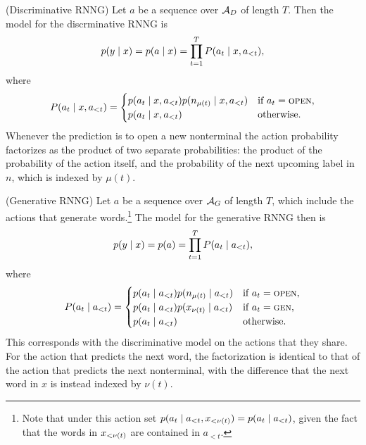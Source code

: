 \begin{definition}{(Discriminative RNNG)}
  Let $a$ be a sequence over $\mathcal{A}_D$ of length $T$. Then the model for the discrminative RNNG is
  \begin{align}
    \label{eq:disc-model}
    p(y \mid x) = p(a \mid x) = \prod_{t=1}^T P( a_t \mid x, a_{<t}),
  \end{align}
  where
  \begin{equation}
    \label{eq:disc-model}
    P( a_t \mid x, a_{<t}) =
    \begin{cases}
      p( a_t \mid x, a_{<t} ) p( n_{ \mu(t) } \mid x, a_{<t} ) & \text{if } a_t = \textsc{open},  \\
      p( a_t \mid x, a_{<t} ) & \text{otherwise.}  \\
    \end{cases}
  \end{equation}
Whenever the prediction is to open a new nonterminal the action probability factorizes as the product of two separate probabilities: the product of the probability of the action itself, and the probability of the next upcoming label in $n$, which is indexed by $\mu(t)$.
\end{definition}

\begin{definition}{(Generative RNNG)}
  Let $a$ be a sequence over $\mathcal{A}_G$ of length $T$, which include the actions that generate words.\footnote{Note that under this action set $p(a_t \mid a_{<t}, x_{<\nu(t)}) = p(a_t \mid a_{<t})$, given the fact that the words in $x_{<\nu(t)}$ are contained in $a_{<t}$.} The model for the generative RNNG then is
  \begin{align}
    \label{eq:disc-model}
    p(y \mid x) = p(a) = \prod_{t=1}^T P( a_t \mid a_{<t}),
  \end{align}
  where
  \begin{equation}
    \label{eq:gen-model}
    P( a_t \mid a_{<t} ) =
    \begin{cases}
      p( a_t \mid a_{<t} ) p(n_{ \mu(t) } \mid a_{<t} ) & \text{if } a_t = \textsc{open},  \\
      p( a_t \mid a_{<t} ) p(x_{ \nu(t) } \mid a_{<t} ) & \text{if } a_t = \textsc{gen},  \\
      p( a_t \mid a_{<t} ) & \text{otherwise.}  \\
    \end{cases}
  \end{equation}
  This corresponds with the discriminative model on the actions that they share. For the action that predicts the next word, the factorization is identical to that of the action that predicts the next nonterminal, with the difference that the next word in $x$ is instead indexed by $\nu(t)$.
\end{definition}

